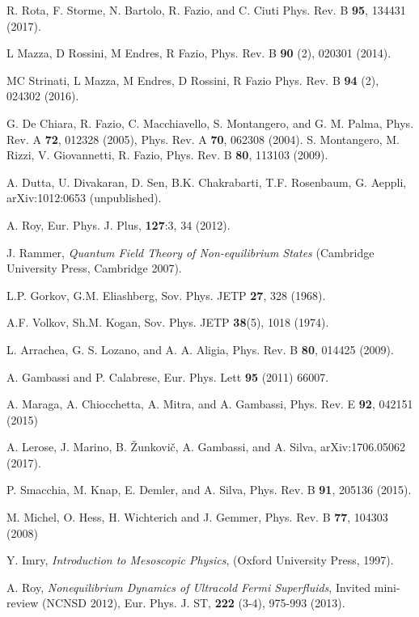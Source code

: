 \documentclass[a4paper,11pt,color]{article}
\renewenvironment{thebibliography}[1]{%
    \begin{oldthebibliography}{#1}%
      \setlength{\parskip}{0ex}%
      \setlength{\itemsep}{0ex}%
  }%
  {%
    \end{oldthebibliography}%
  }
\begin{document}
\begin{thebibliography}{}
R. Rota, F. Storme, N. Bartolo, R. Fazio, and C. Ciuti
Phys. Rev. B {\bf 95}, 134431 (2017).

L Mazza, D Rossini, M Endres, R Fazio, Phys. Rev. B {\bf 90} (2), 020301 (2014).

MC Strinati, L Mazza, M Endres, D Rossini, R Fazio
Phys. Rev. B {\bf 94} (2), 024302 (2016).

G. De Chiara, R. Fazio, C. Macchiavello, S. Montangero, and G. M. Palma, Phys. Rev. A {\bf 72}, 012328 (2005), Phys. Rev. A {\bf 70}, 062308 (2004). S. Montangero, M. Rizzi, V. Giovannetti, R. Fazio, Phys. Rev. B {\bf 80}, 113103 (2009).


A. Dutta, U. Divakaran, D. Sen, B.K. Chakrabarti, T.F. Rosenbaum, G. Aeppli, arXiv:1012:0653 (unpublished).

A. Roy, Eur. Phys. J. {Plus}, {\bf 127}:3, 34 (2012).

J. Rammer, \textit{Quantum Field Theory of Non-equilibrium States} (Cambridge University Press, Cambridge 2007).

L.P. Gorkov, G.M. Eliashberg, Sov. Phys. JETP \textbf{27}, 328 (1968).

A.F. Volkov, Sh.M. Kogan, Sov. Phys. JETP \textbf{38}(5), 1018 (1974).

L. Arrachea, G. S. Lozano, and A. A. Aligia, Phys. Rev. B {\bf 80}, 014425 (2009).

A. Gambassi and P. Calabrese, Eur. Phys. Lett {\bf 95} (2011) 66007.

A. Maraga, A. Chiocchetta, A. Mitra, and A. Gambassi, Phys. Rev. E {\bf 92}, 042151 (2015)

A. Lerose, J. Marino, B. {\v Z}unkovi{\v c}, A. Gambassi, and A. Silva, arXiv:1706.05062 (2017).

P. Smacchia, M. Knap, E. Demler, and A. Silva, Phys. Rev. B {\bf 91}, 205136 (2015).


M. Michel, O. Hess,  H. Wichterich and J. Gemmer, Phys. Rev. B {\bf 77}, 104303 (2008) 

Y. Imry, \textit{Introduction to Mesoscopic Physics}, (Oxford University Press, 1997).

A. Roy, \textit{Nonequilibrium Dynamics of Ultracold Fermi Superfluids}, Invited mini-review (NCNSD $2012$),
Eur. Phys. J. ST, {\bf 222} (3-4), 975-993 (2013).


\end{thebibliography}
\end{document}
